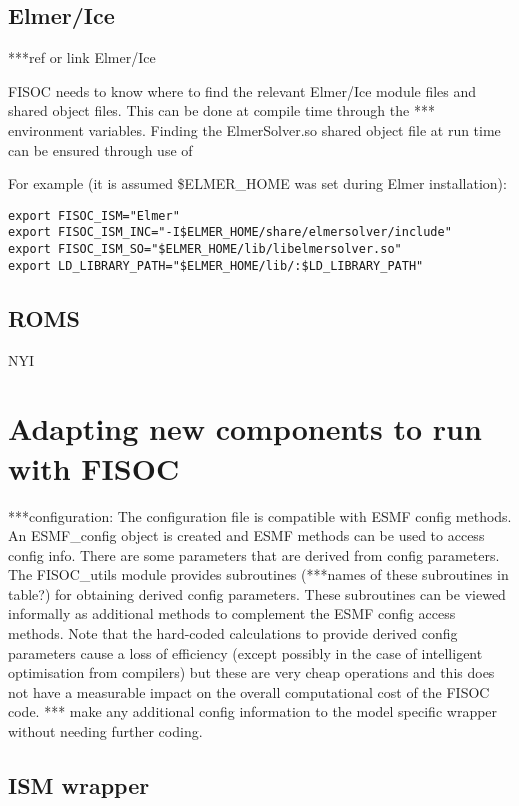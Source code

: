 \documentclass[12pt]{article}
\begin{document}
\subsection{Elmer/Ice}
\label{sec:Elmer}
***ref or link Elmer/Ice

FISOC needs to know where to find the relevant Elmer/Ice module files and shared object files.  
This can be done at compile time through the  *** environment variables.  
Finding the ElmerSolver.so shared object file at run time can be ensured through use of 

For example (it is assumed \$ELMER\_HOME was set during Elmer installation):\\
\begin{lstlisting}
export FISOC_ISM="Elmer"
export FISOC_ISM_INC="-I$ELMER_HOME/share/elmersolver/include"
export FISOC_ISM_SO="$ELMER_HOME/lib/libelmersolver.so"      
export LD_LIBRARY_PATH="$ELMER_HOME/lib/:$LD_LIBRARY_PATH"   
\end{lstlisting}
\label{sec:ROMS}


\subsection{ROMS}

NYI

\section{Adapting new components to run with  FISOC}
\label{sec:FISOC_SDG}


***configuration:
The configuration file is compatible with ESMF config methods.  
An ESMF\_config object is created and ESMF methods can be used to access config info.
There are some parameters that are derived from config parameters.  
The FISOC\_utils module provides subroutines (***names of these subroutines in table?) 
for obtaining derived config parameters.
These subroutines can be viewed informally as additional methods to complement the ESMF config access methods. 
Note that the hard-coded calculations to provide derived config parameters cause a loss of 
efficiency (except possibly in the case of intelligent optimisation from compilers) but these 
are very cheap operations and this does not have a measurable impact on the overall 
computational cost of the FISOC code.
*** make any additional config information to the model specific wrapper without needing further coding.

\subsection{ISM wrapper}
\end{document}
